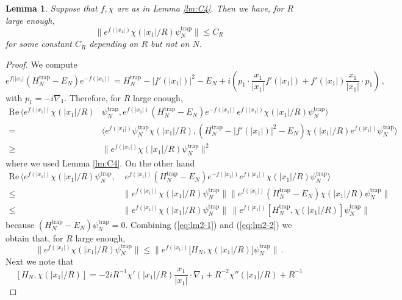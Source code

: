 \documentclass[11pt]{article}
\newtheorem{lemma}[theorem]{Lemma}
\newcommand{\Htrap}{H_N^{\text{trap}}}
\newcommand{\psitrap}{\psi_N^{\text{trap}}}
\begin{document}
\begin{lemma}\label{lm:C5}
Suppose that $f,\chi$ are as in Lemma \ref{lm:C4}. Then we have, for
$R$ large enough,
\begin{equation}
\| e^{f(|x_1|)} \chi (|x_1|/R) \psitrap \| \leq C_R
\end{equation}
for some constant $C_R$ depending on $R$ but not on $N$.
\end{lemma}
\begin{proof}
We compute
\[ e^{f(|x_1|}( \Htrap - E_N) e^{-f(|x_1|)} = \Htrap - |f'
(|x_1|)|^2 - E_N + i \left(p_1 \cdot \frac{x_1}{|x_1|} f' (|x_1|) +
f' (|x_1|) \frac{x_1}{|x_1|} \cdot p_1 \right)\,, \] with $p_1 = -i
\nabla_1$. Therefore, for $R$ large enough,
\begin{equation}\label{eq:lm2-1}
\begin{split}
\text{Re} \, \Big\langle e^{f(|x_1|)} \chi (|x_1|/R) &\psitrap,
e^{f(|x_1|)} \left( \Htrap - E_N \right) e^{-f(|x_1|)} e^{f(|x_1|)}
\chi (|x_1|/R) \psitrap \Big\rangle  \\ = \; & \Big\langle e^{f(|x_1|)}
\psitrap \chi (|x_1|/R),  \left( \Htrap - |f' (|x_1|)|^2 - E_N \right)
\chi (|x_1|/R)e^{f(|x_1|)} \psitrap \Big\rangle \\ \geq \; &\|
e^{f(|x_1|)} \chi (|x_1|/R) \psitrap \|^2
\end{split}
\end{equation}
where we used Lemma \ref{lm:C4}. On the other hand
\begin{equation}\label{eq:lm2-2}
\begin{split}
\text{Re} \, \Big\langle e^{f(|x_1|)} \chi (|x_1|/R) \psitrap,
& \;  e^{f(|x_1|)} \left( \Htrap - E_N \right) e^{-f(|x_1|)} e^{f(|x_1|)}
\chi (|x_1|/R) \psitrap \Big\rangle  \\ \leq \; &\|  e^{f(|x_1|)} \chi
(|x_1|/R) \psitrap \| \Big\| e^{f(|x_1|)} \left( \Htrap - E_N \right)
\chi (|x_1|/R) \psitrap \Big\| \\ \leq \; & \| e^{f(|x_1|)} \chi
(|x_1|/R) \psitrap \| \, \Big\| e^{f(|x_1|)} \left[ \Htrap , \chi
(|x_1|/R) \right]  \psitrap \Big\|
\end{split}
\end{equation}
because $(\Htrap - E_N) \psitrap = 0$. Combining (\ref{eq:lm2-1})
and (\ref{eq:lm2-2}) we obtain that, for $R$ large enough,
\[ \|
e^{f(|x_1|)} \chi (|x_1|/R) \psitrap \| \leq \Big\| e^{f(|x_1|)} \Big[
H_N , \chi (|x_1|/R)\Big] \psitrap \Big\| \,. \] Next we note that
\[\left[ H_N , \chi (|x_1|/R) \right] =   -2i R^{-1} \chi' (|x_1|/R)
\frac{x_1}{|x_1|} \cdot \nabla_1 + R^{-2} \chi'' (|x_1|/R) + R^{-1}
\]
\end{proof}
\end{document}
